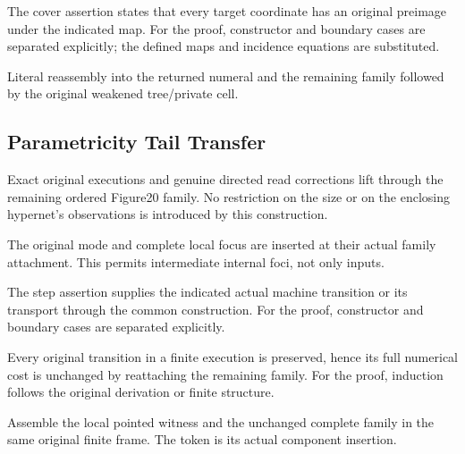 The cover assertion states that every target coordinate has an original preimage under the indicated map.
For the proof, constructor and boundary cases are separated explicitly; the defined maps and incidence equations are substituted.
\par{}

Literal reassembly into the returned numeral and the remaining family followed by the original weakened tree/private cell.
\par{}

\subsection{Parametricity Tail Transfer}
Exact original executions and genuine directed read corrections lift through the remaining ordered Figure20 family. No restriction on the size or on the enclosing hypernet's observations is introduced by this construction.

The original mode and complete local focus are inserted at their actual family attachment. This permits intermediate internal foci, not only inputs.
\par{}

The step assertion supplies the indicated actual machine transition or its transport through the common construction.
For the proof, constructor and boundary cases are separated explicitly.
\par{}

Every original transition in a finite execution is preserved, hence its full numerical cost is unchanged by reattaching the remaining family.
For the proof, induction follows the original derivation or finite structure.
\par{}

Assemble the local pointed witness and the unchanged complete family in the same original finite frame. The token is its actual component insertion.
\par{}

